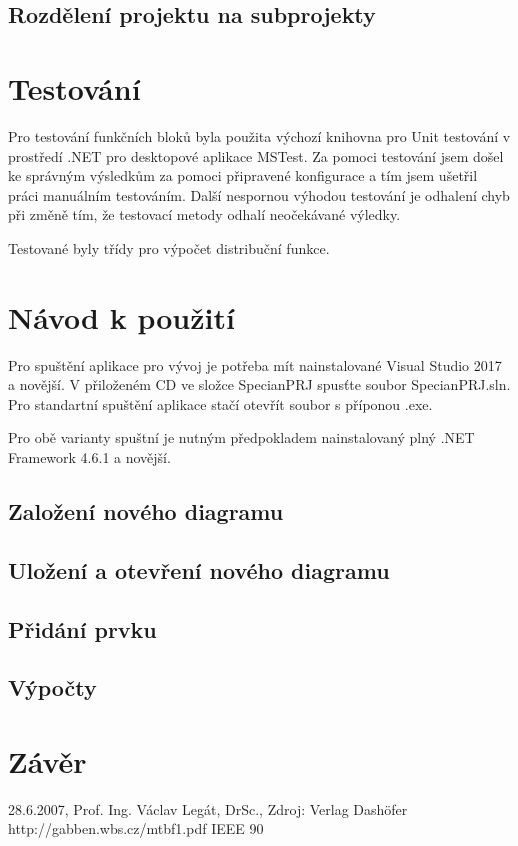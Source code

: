 \documentclass[FM,RP]{tulthesis}
\begin{document}
    \section{Rozdělení projektu na subprojekty}
    \section{}
\chapter{Testování}

    Pro testování funkčních bloků byla použita výchozí knihovna pro Unit testování v prostředí .NET pro desktopové aplikace MSTest.
    Za pomoci testování jsem došel ke správným výsledkům za pomoci připravené konfigurace a tím jsem ušetřil práci manuálním testováním.
    Další nespornou výhodou testování je odhalení chyb při změně tím,  že testovací metody odhalí neočekávané výledky.

    Testované byly třídy pro výpočet distribuční funkce.

\chapter{Návod k použití}

    Pro spuštění aplikace pro vývoj je potřeba mít nainstalované Visual Studio 2017 a novější. V přiloženém CD ve složce SpecianPRJ spusťte soubor SpecianPRJ.sln. 
    Pro standartní spuštění aplikace stačí otevřít soubor s příponou .exe.

    Pro obě varianty spuštní je nutným předpokladem nainstalovaný plný .NET Framework 4.6.1 a novější. 

    \section*{Založení nového diagramu}
    \section*{Uložení a otevření nového diagramu}
    \section*{Přidání prvku}
    \section*{Výpočty}

\chapter{Závěr}



\begin{thebibliography}{Mm99}
        28.6.2007, Prof. Ing. Václav Legát, DrSc., Zdroj: Verlag Dashöfer
        http://gabben.wbs.cz/mtbf1.pdf
        IEEE 90
\end{thebibliography}
\end{document}
